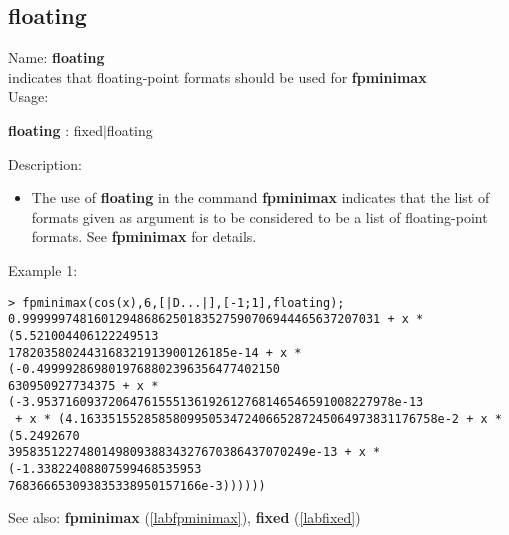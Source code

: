 \subsection{floating}
\label{labfloating}
\noindent Name: \textbf{floating}\\
indicates that floating-point formats should be used for \textbf{fpminimax}\\
\noindent Usage: 
\begin{center}
\textbf{floating} : \textsf{fixed$|$floating}
\\ 
\end{center}
\noindent Description: \begin{itemize}

\item The use of \textbf{floating} in the command \textbf{fpminimax} indicates that the list of
   formats given as argument is to be considered to be a list of floating-point
   formats.
   See \textbf{fpminimax} for details.
\end{itemize}
\noindent Example 1: 
\begin{center}\begin{minipage}{15cm}\begin{Verbatim}[frame=single]
> fpminimax(cos(x),6,[|D...|],[-1;1],floating);
0.99999974816012948686250183527590706944465637207031 + x * (5.521004406122249513
1782035802443168321913900126185e-14 + x * (-0.4999928698019768802396356477402150
630950927734375 + x * (-3.95371609372064761555136192612768146546591008227978e-13
 + x * (4.16335155285858099505347240665287245064973831176758e-2 + x * (5.2492670
395835122748014980938834327670386437070249e-13 + x * (-1.33822408807599468535953
768366653093835338950157166e-3))))))
\end{Verbatim}
\end{minipage}\end{center}
See also: \textbf{fpminimax} (\ref{labfpminimax}), \textbf{fixed} (\ref{labfixed})
